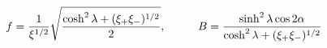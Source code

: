 \begin{equation}
f = { 1 \over \xi^{1/2}} \sqrt{\cosh^2 \lambda + (\xi_+ \xi_-)^{1/2}
\over 2}, \hspace{1cm}
B = {  \sinh^2 \lambda \cos 2 \alpha \over  \cosh^2 \lambda
+ (\xi_+ \xi_-)^{1/2}}
\end{equation}

